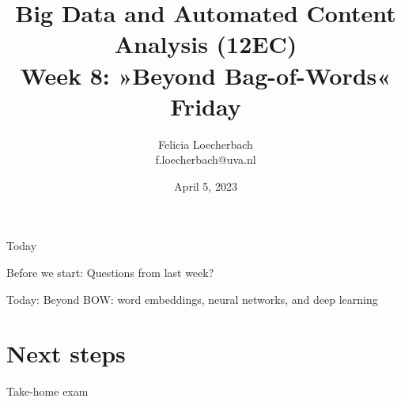 

\graphicspath{{../../resources/img/}}




\title[Big Data and Automated Content Analysis]{\textbf{Big Data and Automated Content Analysis (12EC)} 
\\Week 8: »Beyond Bag-of-Words«
\\Friday}
\author[Felicia Loecherbach]{Felicia Loecherbach\\ \footnotesize{f.loecherbach@uva.nl \\}}
\date{April 5, 2023}


\begin{frame}{}
	\titlepage
\end{frame}

\begin{frame}{Today}
	\tableofcontents
\end{frame}
\begin{frame}[standout]
Before we start: Questions from last week?
\end{frame}


\begin{frame}[standout]
Today: Beyond BOW: word embeddings, neural networks, and deep learning
\end{frame}









\section{Next steps}
\begin{frame}[standout]
Take-home exam
\end{frame}


\begin{frame}
\printbibliography
\end{frame}




